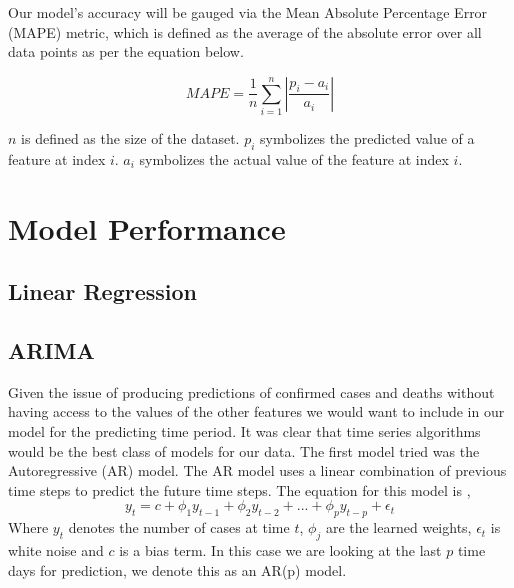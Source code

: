 \documentclass[sigconf,nonacm]{acmart}
\begin{document}
Our model's accuracy will be gauged via the Mean Absolute Percentage Error
(MAPE) metric, which is defined as the average of the absolute error over all
data points as per the equation below. 

$$MAPE = \frac{1}{n} \sum_{i = 1}^{n} |\frac{p_i - a_i}{a_i} |$$

$n$ is defined as the size of the dataset. $p_i$ symbolizes the predicted value
of a feature at index $i$. $a_i$ symbolizes the actual value of the feature at
index $i$.


\section{Model Performance}
\subsection{Linear Regression}
\subsection{ARIMA}
Given the issue of producing predictions of confirmed cases and deaths without
having access to the values of the other features we would want to include in 
our model for the predicting time period. It was clear that time series algorithms
would be the best class of models for our data. The first model tried was the
Autoregressive (AR) model. The AR model uses a linear combination of previous
time steps to predict the future time steps. The equation for this model is \cite{forecasting},
\begin{equation}
 y_t = c + \phi_1 y_{t-1} + \phi_2 y_{t-2} + ... + \phi_p y_{t-p} + \epsilon_t 
\end{equation}
Where $y_t$ denotes the number of cases at time $t$, $\phi_j$ are the learned weights,
 $\epsilon_t$ is white noise and $c$ is a bias term. In this case we are looking at the last $p$ time days
for prediction, we denote this as an AR(p) model. 
\end{document}
